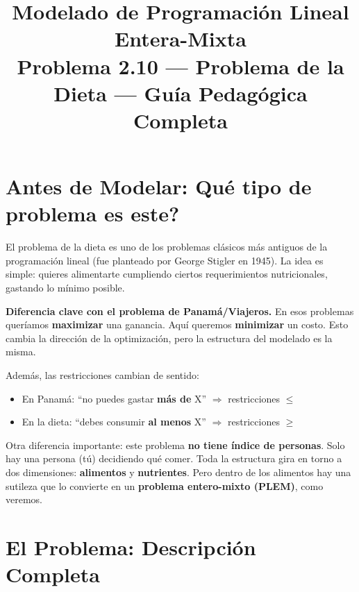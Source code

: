 \documentclass[12pt]{article}
\title{\textbf{Modelado de Programaci\'on Lineal Entera-Mixta} \\[0.5em]
\large Problema 2.10 --- Problema de la Dieta --- Gu\'ia Pedag\'ogica Completa}
\author{}
\date{}
\begin{document}
\maketitle
\tableofcontents
\newpage

\section{Antes de Modelar: \textquestiondown Qu\'e tipo de problema es este?}

El problema de la dieta es uno de los problemas cl\'asicos m\'as antiguos de la programaci\'on lineal (fue planteado por George Stigler en 1945). La idea es simple: quieres alimentarte cumpliendo ciertos requerimientos nutricionales, gastando lo m\'inimo posible.

\begin{cajazul}
\textbf{Diferencia clave con el problema de Panam\'a/Viajeros.} En esos problemas quer\'iamos \textbf{maximizar} una ganancia. Aqu\'i queremos \textbf{minimizar} un costo. Esto cambia la direcci\'on de la optimizaci\'on, pero la estructura del modelado es la misma.

Adem\'as, las restricciones cambian de sentido:
\begin{itemize}
    \item En Panam\'a: ``no puedes gastar \textbf{m\'as de} X'' $\Rightarrow$ restricciones $\leq$
    \item En la dieta: ``debes consumir \textbf{al menos} X'' $\Rightarrow$ restricciones $\geq$
\end{itemize}
\end{cajazul}

Otra diferencia importante: este problema \textbf{no tiene \'indice de personas}. Solo hay una persona (t\'u) decidiendo qu\'e comer. Toda la estructura gira en torno a dos dimensiones: \textbf{alimentos} y \textbf{nutrientes}. Pero dentro de los alimentos hay una sutileza que lo convierte en un \textbf{problema entero-mixto (PLEM)}, como veremos.

\section{El Problema: Descripci\'on Completa}
\end{document}

